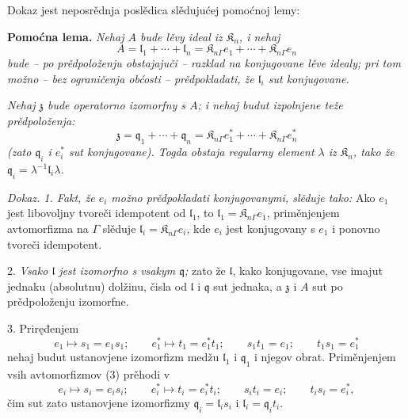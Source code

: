 \documentclass[11pt]{article}
\begin{document}
Dokaz jest neposrědnja poslědica slědujućej pomoćnoj lemy:

\textbf{Pomoćna lema.} \emph{Nehaj \(A\) bude lěvy ideal iz \(\mathfrak K_n\), i nehaj}
\[
A=\mathfrak l_1+\cdots+\mathfrak l_n
=\mathfrak K_{n\Gamma}e_1+\cdots+\mathfrak K_{n\Gamma}e_n
\]
\emph{bude -- po prědpoloženju obstajajuči -- razklad na konjugovane lěve idealy; pri tom možno -- bez ograničenja obćosti -- prědpokladati, že \(\mathfrak l_i\) sut konjugovane.}

\emph{Nehaj \(\mathfrak z\) bude operatorno izomorfny s \(A\); i nehaj budut izpolnjene teže prědpoloženja:}
\[
\mathfrak z=\mathfrak q_1+\cdots+\mathfrak q_n
=\mathfrak K_{n\Gamma}e_1^*+\cdots+\mathfrak K_{n\Gamma}e_n^*
\]
\emph{(zato \(\mathfrak q_i\) i \(e_i^*\) sut konjugovane). Togda obstaja regularny element \(\lambda\) iz \(\mathfrak K_n\), tako že \(\mathfrak q_i=\lambda^{-1}\mathfrak l_i\lambda\).}

\emph{Dokaz. 1. Fakt, že \(e_i\) možno prědpokladati konjugovanymi, slěduje tako:} Ako \(e_1\) jest libovoljny tvoreči idempotent od \(\mathfrak l_1\), to \(\mathfrak l_1=\mathfrak K_{n\Gamma}e_1\), priměnjenjem avtomorfizma na \(\Gamma\) slěduje \(\mathfrak l_i=\mathfrak K_{n\Gamma}e_i\), kde \(e_i\) jest konjugovany s \(e_1\) i ponovno tvoreči idempotent.

2. \emph{Vsako \(\mathfrak l\) jest izomorfno s vsakym \(\mathfrak q\);} zato že \(\mathfrak l\), kako konjugovane, vse imajut jednaku (absolutnu) dolžinu, čisla od \(\mathfrak l\) i \(\mathfrak q\) sut jednaka, a \(\mathfrak z\) i \(A\) sut po prědpoloženju izomorfne.

3. Priręđenjem
\[
\tag{3}
e_1\mapsto s_1=e_1s_1;\qquad
e_1^*\mapsto t_1=e_1^*t_1;\qquad
s_1t_1=e_1;\qquad
t_1s_1=e_1^*
\]
nehaj budut ustanovjene izomorfizm medžu \(\mathfrak l_1\) i \(\mathfrak q_1\) i njegov obrat. Priměnjenjem vsih avtomorfizmov (3) prěhodi v
\[
e_i\mapsto s_i=e_is_i;\qquad
e_i^*\mapsto t_i=e_i^*t_i;\qquad
s_it_i=e_i;\qquad
t_is_i=e_i^*,
\]
čim sut zato ustanovjene izomorfizmy \(\mathfrak q_i=\mathfrak l_is_i\) i \(\mathfrak l_i=\mathfrak q_it_i\).
\end{document}
